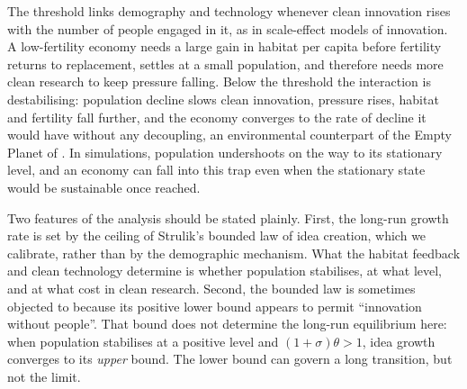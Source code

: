 \documentclass[11pt]{article}
\begin{document}
The threshold links demography and technology whenever clean innovation rises with the number of people
engaged in it, as in scale-effect models of innovation. A low-fertility economy needs a large gain in
habitat per
capita before fertility returns to replacement, settles at a small population, and therefore needs more
clean research to keep pressure falling. Below the threshold the interaction is destabilising:
population decline slows clean innovation, pressure rises, habitat and fertility fall further, and the
economy converges to the rate of decline it would have without any decoupling, an environmental
counterpart of the Empty Planet of \citet{jones22}. In simulations, population undershoots on the way
to its stationary level, and an economy can fall into this trap even when the stationary state would be
sustainable once reached.

Two features of the analysis should be stated plainly. First, the long-run growth rate is set by the
ceiling of Strulik's bounded law of idea creation, which we calibrate, rather than by the demographic
mechanism. What the habitat feedback and clean technology determine is whether population stabilises,
at what level, and at what cost in clean research. Second, the bounded law is sometimes objected to
because its positive lower bound appears to permit ``innovation without people''. That bound does not
determine the long-run equilibrium here: when population stabilises at a positive level and
$(1+\sigma)\theta>1$, idea growth converges to its \emph{upper} bound. The lower bound can govern a long
transition, but not the limit.
\end{document}
